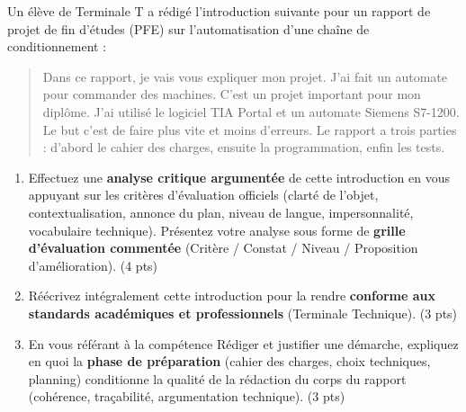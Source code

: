 \documentclass[11pt]{article}
\begin{document}
\begin{exercice}
Un élève de Terminale T a rédigé l'introduction suivante pour un rapport de projet de fin d'études (PFE) sur l'automatisation d'une chaîne de conditionnement :

\begin{quote}
\og{}Dans ce rapport, je vais vous expliquer mon projet. J'ai fait un automate pour commander des machines. C'est un projet important pour mon diplôme. J'ai utilisé le logiciel TIA Portal et un automate Siemens S7-1200. Le but c'est de faire plus vite et moins d'erreurs. Le rapport a trois parties : d'abord le cahier des charges, ensuite la programmation, enfin les tests.\fg{}
\end{quote}

\begin{enumerate}
    \item Effectuez une \textbf{analyse critique argumentée} de cette introduction en vous appuyant sur les critères d'évaluation officiels (clarté de l'objet, contextualisation, annonce du plan, niveau de langue, impersonnalité, vocabulaire technique). Présentez votre analyse sous forme de \textbf{grille d'évaluation commentée} (Critère / Constat / Niveau / Proposition d'amélioration). (4 pts)
    \item Réécrivez intégralement cette introduction pour la rendre \textbf{conforme aux standards académiques et professionnels} (Terminale Technique). (3 pts)
    \item En vous référant à la compétence \og{}Rédiger et justifier une démarche\fg{}, expliquez en quoi la \textbf{phase de préparation} (cahier des charges, choix techniques, planning) conditionne la qualité de la rédaction du corps du rapport (cohérence, traçabilité, argumentation technique). (3 pts)
\end{enumerate}
\end{exercice}
\end{document}
